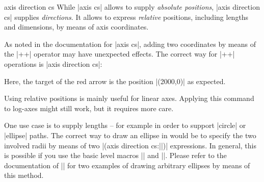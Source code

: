 \begin{coordinatesystem}{axis direction cs}
    While |axis cs| allows to supply \emph{absolute positions},
    |axis direction cs| supplies \emph{directions}. It allows to express
    \emph{relative} positions, including lengths and dimensions, by means of
    axis coordinates.

    As noted in the documentation for |axis cs|, adding two coordinates by
    means of the \tikzname{} |++| operator may have unexpected effects. The
    correct way for |++| operations is |axis direction cs|:
\begin{codeexample}[]
\end{codeexample}
    \noindent Here, the target of the red arrow is the position |(2000,0)| as
    expected.

    Using relative positions is mainly useful for linear axes. Applying this
    command to log-axes might still work, but it requires more care.

    One use case is to supply lengths -- for example in order to support
    |circle| or |ellipse| paths. The correct way to draw an ellipse in
    \PGFPlots{} would be to specify the two involved radii by means of two
    |(axis direction cs:||)| expressions. In general, this is
    possible if you use the basic level macros |\pgfpathellipse| and
    |\pgfplotspointaxisdirectionxy|. Please refer to the documentation of
    |\pgfplotspointaxisdirectionxy| for two examples of drawing arbitrary
    ellipses by means of this method.


\end{coordinatesystem}
